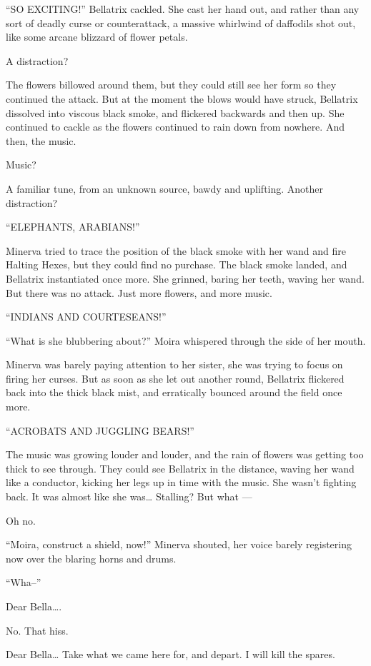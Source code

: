 “SO EXCITING!” Bellatrix cackled. She cast her hand out, and rather than any sort of deadly curse or counterattack, a massive whirlwind of daffodils shot out, like some arcane blizzard of flower petals.

A distraction?

The flowers billowed around them, but they could still see her form so they continued the attack. But at the moment the blows would have struck, Bellatrix dissolved into viscous black smoke, and flickered backwards and then up. She continued to cackle as the flowers continued to rain down from nowhere. And then, the music.

Music?

A familiar tune, from an unknown source, bawdy and uplifting. Another distraction?

“ELEPHANTS, ARABIANS!”

Minerva tried to trace the position of the black smoke with her wand and fire Halting Hexes, but they could find no purchase. The black smoke landed, and Bellatrix instantiated once more. She grinned, baring her teeth, waving her wand. But there was no attack. Just more flowers, and more music.

“INDIANS AND COURTESEANS!”

“What is she blubbering about?” Moira whispered through the side of her mouth.

Minerva was barely paying attention to her sister, she was trying to focus on firing her curses. But as soon as she let out another round, Bellatrix flickered back into the thick black mist, and erratically bounced around the field once more.

“ACROBATS AND JUGGLING BEARS!”

The music was growing louder and louder, and the rain of flowers was getting too thick to see through. They could see Bellatrix in the distance, waving her wand like a conductor, kicking her legs up in time with the music. She wasn’t fighting back. It was almost like she was… Stalling? But what —

Oh no.

“Moira, construct a shield, now!” Minerva shouted, her voice barely registering now over the blaring horns and drums.

“Wha–”

Dear Bella….

No. That hiss.

Dear Bella… Take what we came here for, and depart. I will kill the spares.

